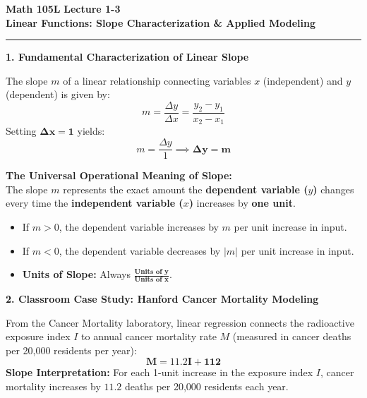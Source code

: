 \documentclass[10.5pt]{article}
\begin{document}
\noindent \textbf{\large Math 105L} \hfill \textbf{\large Lecture 1-3}\\[1pt]
{\textbf{\Large Linear Functions: Slope Characterization \& Applied Modeling}}\\[-5pt]
\rule{\textwidth}{1.2pt}

\vspace{0.03in}

\textbf{\large 1. Fundamental Characterization of Linear Slope}

The slope $m$ of a linear relationship connecting variables $x$ (independent) and $y$ (dependent) is given by:
\[
  m = \frac{\Delta y}{\Delta x} = \frac{y_2 - y_1}{x_2 - x_1}
\]
Setting $\mathbf{\Delta x = 1}$ yields:
\[
  m = \frac{\Delta y}{1} \implies \mathbf{\Delta y = m}
\]

\begin{tcolorbox}[colback=boxbg, colframe=boxframe, boxrule=0.8pt, arc=3pt, left=8pt, right=8pt, top=4pt, bottom=4pt]
\textbf{The Universal Operational Meaning of Slope:}\\[2pt]
The slope $m$ represents the exact amount the \textbf{dependent variable ($y$)} changes every time the \textbf{independent variable ($x$)} increases by \textbf{one unit}.
\begin{itemize}[leftmargin=1.2em, topsep=1pt, itemsep=2pt]
  \item If $m > 0$, the dependent variable increases by $m$ per unit increase in input.
  \item If $m < 0$, the dependent variable decreases by $|m|$ per unit increase in input.
  \item \textbf{Units of Slope:} Always $\mathbf{\frac{\text{Units of } y}{\text{Units of } x}}$.
\end{itemize}
\end{tcolorbox}

\vspace{0.04in}

\textbf{\large 2. Classroom Case Study: Hanford Cancer Mortality Modeling}

From the Cancer Mortality laboratory, linear regression connects the radioactive exposure index $I$ to annual cancer mortality rate $M$ (measured in cancer deaths per 20,000 residents per year):
\[
  \mathbf{M = 11.2 I + 112}
\]
\textbf{Slope Interpretation:} For each 1-unit increase in the exposure index $I$, cancer mortality increases by $11.2$ deaths per 20,000 residents each year.
\end{document}
